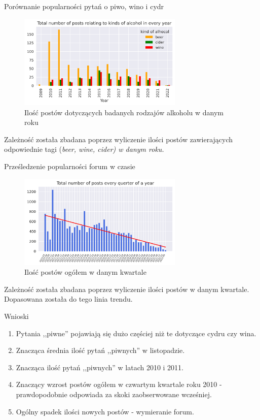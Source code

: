\documentclass[./main.tex]{subfiles}
\begin{document}
\begin{frame}{Porównanie popularności pytań o piwo, wino i cydr}
    \begin{figure}[t]
        \includegraphics[width=0.7\textwidth]{homebrewing/h2.png}
        \caption*{Ilość postów dotyczących badanych rodzajów alkoholu w danym roku}
    \end{figure}
    \small Zależność została zbadana poprzez wyliczenie ilości postów zawierających odpowiednie tagi (\it{beer}, \it{wine}, \it{cider}) w danym roku.
\end{frame}

\begin{frame}{Prześledzenie popularności forum w czasie}
    \begin{figure}[t]
        \includegraphics[width=0.7\textwidth]{homebrewing/h3.png}
        \caption*{Ilość postów ogółem w danym kwartale}
    \end{figure}
    \small Zależność została zbadana poprzez wyliczenie ilości postów w danym kwartale. Dopasowana została do tego linia trendu.
\end{frame}

\begin{frame}{Wnioski}
    \begin{enumerate}
        \item Pytania ,,piwne'' pojawiają się dużo częściej niż te dotyczące cydru czy wina.
        \item Znacząca średnia ilość pytań ,,piwnych'' w listopadzie.
        \item Znacząca ilość pytań ,,piwnych'' w latach 2010 i 2011.
        \item Znaczący wzrost postów ogółem w czwartym kwartale roku 2010 - prawdopodobnie odpowiada za skoki zaobserwowane wcześniej.
        \item Ogólny spadek ilości nowych postów - wymieranie forum.
    \end{enumerate}
\end{frame}
\end{document}
